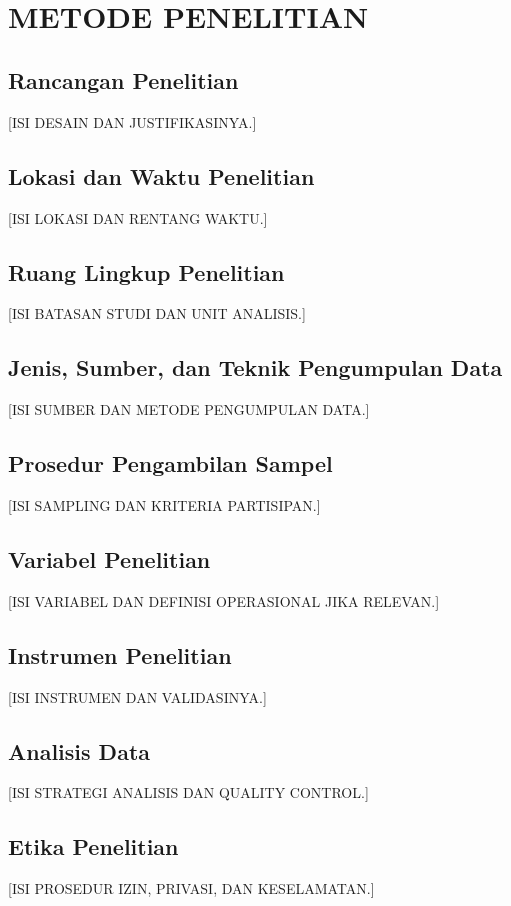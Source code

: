\chapter[METODE PENELITIAN]{\\ METODE PENELITIAN}
\section{Rancangan Penelitian}
[ISI DESAIN DAN JUSTIFIKASINYA.]

\section{Lokasi dan Waktu Penelitian}
[ISI LOKASI DAN RENTANG WAKTU.]

\section{Ruang Lingkup Penelitian}
[ISI BATASAN STUDI DAN UNIT ANALISIS.]

\section{Jenis, Sumber, dan Teknik Pengumpulan Data}
[ISI SUMBER DAN METODE PENGUMPULAN DATA.]

\section{Prosedur Pengambilan Sampel}
[ISI SAMPLING DAN KRITERIA PARTISIPAN.]

\section{Variabel Penelitian}
[ISI VARIABEL DAN DEFINISI OPERASIONAL JIKA RELEVAN.]

\section{Instrumen Penelitian}
[ISI INSTRUMEN DAN VALIDASINYA.]

\section{Analisis Data}
[ISI STRATEGI ANALISIS DAN QUALITY CONTROL.]

\section{Etika Penelitian}
[ISI PROSEDUR IZIN, PRIVASI, DAN KESELAMATAN.]
